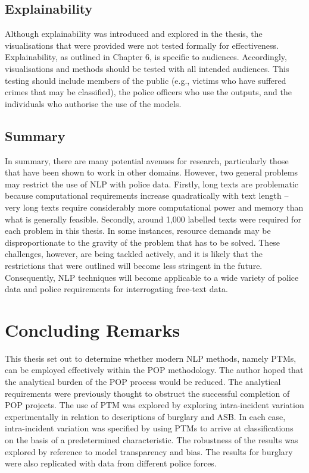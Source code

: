 \subsection{Explainability} Although explainability was introduced and explored in the thesis, the visualisations that were provided were not tested formally for effectiveness. Explainability, as outlined in Chapter 6, is specific to audiences. Accordingly, visualisations and methods should be tested with all intended audiences. This testing should include members of the public (e.g., victims who have suffered crimes that may be classified), the police officers who use the outputs, and the individuals who authorise the use of the models.

\subsection{Summary} In summary, there are many potential avenues for research, particularly those that have been shown to work in other domains. However, two general problems may restrict the use of NLP with police data. Firstly, long texts are problematic because computational requirements increase quadratically with text length – very long texts require considerably more computational power and memory than what is generally feasible. Secondly, around 1,000 labelled texts were required for each problem in this thesis. In some instances, resource demands may be disproportionate to the gravity of the problem that has to be solved. These challenges, however, are being tackled actively, and it is likely that the restrictions that were outlined will become less stringent in the future. Consequently, NLP techniques will become applicable to a wide variety of police data and police requirements for interrogating free-text data.


\section{Concluding Remarks} This thesis set out to determine whether modern NLP methods, namely PTMs, can be employed effectively within the POP methodology. The author hoped that the analytical burden of the POP process would be reduced. The analytical requirements were previously thought to obstruct the successful completion of POP projects. The use of PTM was explored by exploring intra-incident variation experimentally in relation to descriptions of burglary and ASB. In each case, intra-incident variation was specified by using PTMs to arrive at classifications on the basis of a predetermined characteristic. The robustness of the results was explored by reference to model transparency and bias. The results for burglary were also replicated with data from different police forces.

